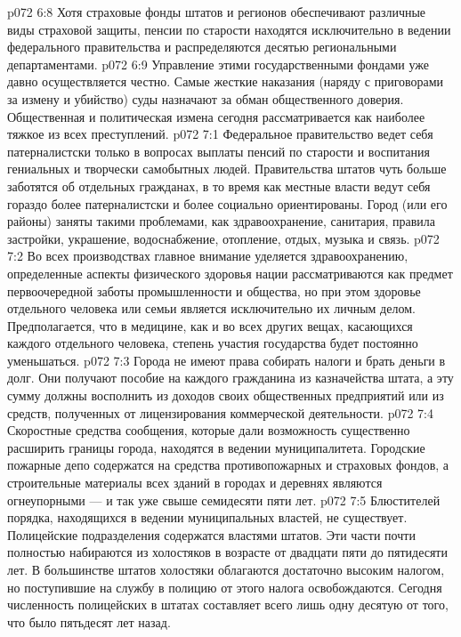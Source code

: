 \vs p072 6:8 \pc Хотя страховые фонды штатов и регионов обеспечивают различные виды страховой защиты, пенсии по старости находятся исключительно в ведении федерального правительства и распределяются десятью региональными департаментами.
\vs p072 6:9 Управление этими государственными фондами уже давно осуществляется честно. Самые жесткие наказания (наряду с приговорами за измену и убийство) суды назначают за обман общественного доверия. Общественная и политическая измена сегодня рассматривается как наиболее тяжкое из всех преступлений.
\vs p072 7:1 Федеральное правительство ведет себя патерналистски только в вопросах выплаты пенсий по старости и воспитания гениальных и творчески самобытных людей. Правительства штатов чуть больше заботятся об отдельных гражданах, в то время как местные власти ведут себя гораздо более патерналистски и более социально ориентированы. Город (или его районы) заняты такими проблемами, как здравоохранение, санитария, правила застройки, украшение, водоснабжение, отопление, отдых, музыка и связь.
\vs p072 7:2 Во всех производствах главное внимание уделяется здравоохранению, определенные аспекты физического здоровья нации рассматриваются как предмет первоочередной заботы промышленности и общества, но при этом здоровье отдельного человека или семьи является исключительно их личным делом. Предполагается, что в медицине, как и во всех других вещах, касающихся каждого отдельного человека, степень участия государства будет постоянно уменьшаться.
\vs p072 7:3 \pc Города не имеют права собирать налоги и брать деньги в долг. Они получают пособие на каждого гражданина из казначейства штата, а эту сумму должны восполнить из доходов своих общественных предприятий или из средств, полученных от лицензирования коммерческой деятельности.
\vs p072 7:4 Скоростные средства сообщения, которые дали возможность существенно расширить границы города, находятся в ведении муниципалитета. Городские пожарные депо содержатся на средства противопожарных и страховых фондов, а строительные материалы всех зданий в городах и деревнях являются огнеупорными --- и так уже свыше семидесяти пяти лет.
\vs p072 7:5 Блюстителей порядка, находящихся в ведении муниципальных властей, не существует. Полицейские подразделения содержатся властями штатов. Эти части почти полностью набираются из холостяков в возрасте от двадцати пяти до пятидесяти лет. В большинстве штатов холостяки облагаются достаточно высоким налогом, но поступившие на службу в полицию от этого налога освобождаются. Сегодня численность полицейских в штатах составляет всего лишь одну десятую от того, что было пятьдесят лет назад.
